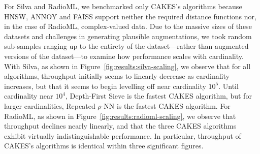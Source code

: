 For Silva and RadioML, we benchmarked only CAKES's algorithms because HNSW, ANNOY and FAISS support neither the required distance functions nor, in the case of RadioML, complex-valued data.
Due to the massive sizes of these datasets and challenges in generating plausible augmentations, we took random sub-samples ranging up to the entirety of the dataset---rather than augmented versions of the dataset---to examine how performance scales with cardinality.
With Silva, as shown in Figure~\ref{fig:results:silva-scaling}, we observe that for all algorithms, throughput initially seems to linearly decrease as cardinality increases, but that it seems to begin levelling off near cardinality $10^5$.
Until cardinality near $10^4$, Depth-First Sieve is the fastest CAKES algorithm, but for larger cardinalities, Repeated $\rho$-NN is the fastest CAKES algorithm.
For RadioML, as shown in Figure~\ref{fig:results:radioml-scaling}, we observe that throughput declines nearly linearly, and that the three CAKES algorithms exhibit virtually indistinguishable performance.
In particular, throughput of CAKES's algorithms is identical within three significant figures.

